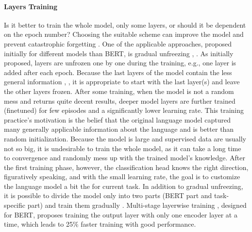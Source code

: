 \paragraph{Layers Training} Is it better to train the whole model, only some layers, or should it be dependent on the epoch number? Choosing the suitable scheme can improve the model and prevent catastrophic forgetting \citep{Liu2020}. One of the applicable approaches, proposed initially for different models than BERT, is gradual unfreezing \citep{Ruder2018}, \citep{Chronopoulou2019}. As initially proposed, layers are unfrozen one by one during the training, e.g., one layer is added after each epoch. Because the last layers of the model contain the less general information \citep{Ruder2018}, \citep{Yosinski2014}, it is appropriate to start with the last layer(s) and leave the other layers frozen. After some training, when the model is not a random mess and returns quite decent results, deeper model layers are further trained (finetuned) for few episodes and a significantly lower learning rate. This training practice's motivation is the belief that the original language model captured many generally applicable information about the language and is better than random initialization. Because the model is large and supervised data are usually not so big, it is undesirable to train the whole model, as it can take a long time to convergence and randomly mess up with the trained model's knowledge. After the first training phase, however, the classification head knows the right direction, figuratively speaking, and with the small learning rate, the goal is to customize the language model a bit the for current task. In addition to gradual unfreezing, it is possible to divide the model only into two parts (BERT part and task-specific part) and train them gradually \citep{Kondratyuk2019}. Multi-stage layerwise training \citep{Yang2020}, designed for BERT, proposes training the output layer with only one encoder layer at a time, which leads to 25\% faster training with good performance.
